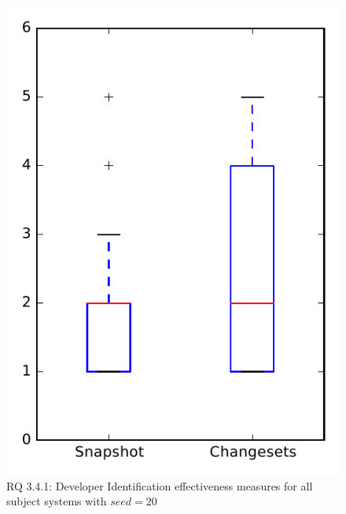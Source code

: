 
\begin{figure}
\centering
\includegraphics[height=0.4\textheight]{figures/dit_seed/rq1_overview_20}
\caption{RQ 3.4.1: Developer Identification effectiveness measures for all subject systems with $seed=20$}
\label{fig:dit_seed:rq1:overview}
\end{figure}
